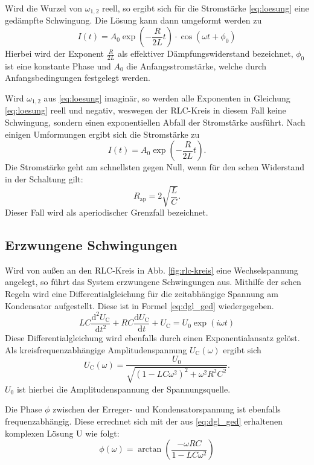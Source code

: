 Wird die Wurzel von $\omega_{1,2}$ reell, so ergibt sich für die Stromstärke \eqref{eq:loesung} eine gedämpfte Schwingung. Die Lösung kann dann umgeformt werden zu
\begin{equation}
\label{eq:loesung_ged}
I(t) = A_0 \exp\left({-\frac{R}{2L}t}\right) \cdot \cos({\omega t + \phi_0})
\end{equation}
Hierbei wird der Exponent $\frac{R}{2L}$ als effektiver Dämpfungswiderstand bezeichnet, $\phi_0$ ist eine konstante Phase und $A_0$ die Anfangsstromstärke, welche durch Anfangsbedingungen festgelegt werden.

Wird $\omega_{1,2}$ aus \eqref{eq:loesung} imaginär, so werden alle Exponenten in Gleichung \eqref{eq:loesung} reell und negativ, weswegen der RLC-Kreis in diesem Fall keine Schwingung, sondern einen exponentiellen Abfall der Stromstärke ausführt.
Nach einigen Umformungen ergibt sich die Stromstärke zu
\begin{equation}
\label{eq:loesung_ged}
I(t) = A_0 \exp\left({-\frac{R}{2L}t}\right).
\end{equation}
Die Stromstärke geht am schnellsten gegen Null, wenn für den schen Widerstand in der Schaltung gilt:
\begin{equation}
\label{eq:rap}
R_{\text{ap}} = 2\sqrt{\frac{L}{C}}.
\end{equation}
Dieser Fall wird als aperiodischer Grenzfall bezeichnet.

\subsection{Erzwungene Schwingungen}
Wird von außen an den RLC-Kreis in Abb. \ref{fig:rlc-kreis} eine Wechselspannung angelegt, so führt das System erzwungene Schwingungen aus.
Mithilfe der schen Regeln wird eine Differentialgleichung für die zeitabhängige Spannung am Kondensator aufgestellt. Diese ist in Formel \eqref{eq:dgl_ged} wiedergegeben.
\begin{equation}
\label{eq:dgl_ged}
LC \frac{\text{d}^2 U_\text{C}}{\text{d}t^2} + RC \frac{\text{d}U_\text{C}}{\text{d}t} + U_\text{C} = U_0 \exp({i\omega t})
\end{equation}
Diese Differentialgleichung wird ebenfalls durch einen Exponentialansatz gelöst. Als kreisfrequenzabhängige Amplitudenspannung $U_\text{C}(\omega)$ ergibt sich
\begin{equation}
\label{eq:amplitude_freq}
U_\text{C}(\omega) = \frac{U_0}{ \sqrt{ (1 - LC \omega^2)^2 + \omega^2 R^2 C^2  }}.
\end{equation}
$U_0$ ist hierbei die Amplitudenspannung der Spannungsquelle.

Die Phase $\phi$ zwischen der Erreger- und Kondensatorspannung ist ebenfalls frequenzabhängig. Diese errechnet sich mit der aus \eqref{eq:dgl_ged} erhaltenen komplexen Lösung U wie folgt:
\begin{equation}
\label{eq:phase_freq}
\phi(\omega) = \arctan{\left(\frac{-\omega R C}{1 - LC \omega^2}\right)}
\end{equation}
